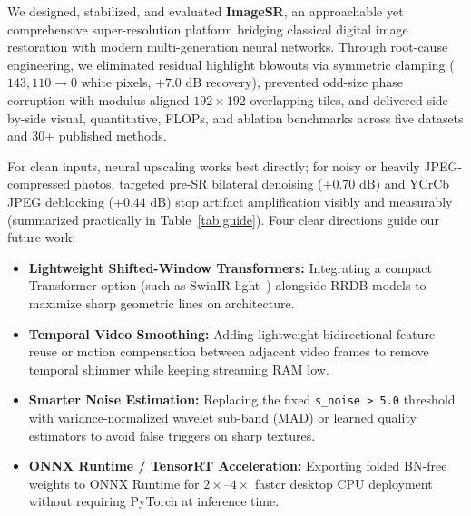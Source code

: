 \documentclass[10pt,onecolumn,journal]{IEEEtran}
\begin{document}
We designed, stabilized, and evaluated \textbf{ImageSR}, an approachable yet comprehensive super-resolution platform bridging classical digital image restoration with modern multi-generation neural networks. Through root-cause engineering, we eliminated residual highlight blowouts via symmetric clamping ($143{,}110 \to 0$ white pixels, $+7.0\text{ dB}$ recovery), prevented odd-size phase corruption with modulus-aligned $192\times192$ overlapping tiles, and delivered side-by-side visual, quantitative, FLOPs, and ablation benchmarks across five datasets and 30+ published methods.

For clean inputs, neural upscaling works best directly; for noisy or heavily JPEG-compressed photos, targeted pre-SR bilateral denoising ($+0.70\text{ dB}$) and YCrCb JPEG deblocking ($+0.44\text{ dB}$) stop artifact amplification visibly and measurably (summarized practically in Table~\ref{tab:guide}). Four clear directions guide our future work:
\begin{itemize}
    \item \textbf{Lightweight Shifted-Window Transformers:} Integrating a compact Transformer option (such as SwinIR-light~\cite{liang2021swinir}) alongside RRDB models to maximize sharp geometric lines on architecture.
    \item \textbf{Temporal Video Smoothing:} Adding lightweight bidirectional feature reuse or motion compensation between adjacent video frames to remove temporal shimmer while keeping streaming RAM low.
    \item \textbf{Smarter Noise Estimation:} Replacing the fixed \texttt{s\_noise > 5.0} threshold with variance-normalized wavelet sub-band (MAD) or learned quality estimators to avoid false triggers on sharp textures.
    \item \textbf{ONNX Runtime / TensorRT Acceleration:} Exporting folded BN-free weights to ONNX Runtime for $2\times$--$4\times$ faster desktop CPU deployment without requiring PyTorch at inference time.
\end{itemize}
\end{document}
